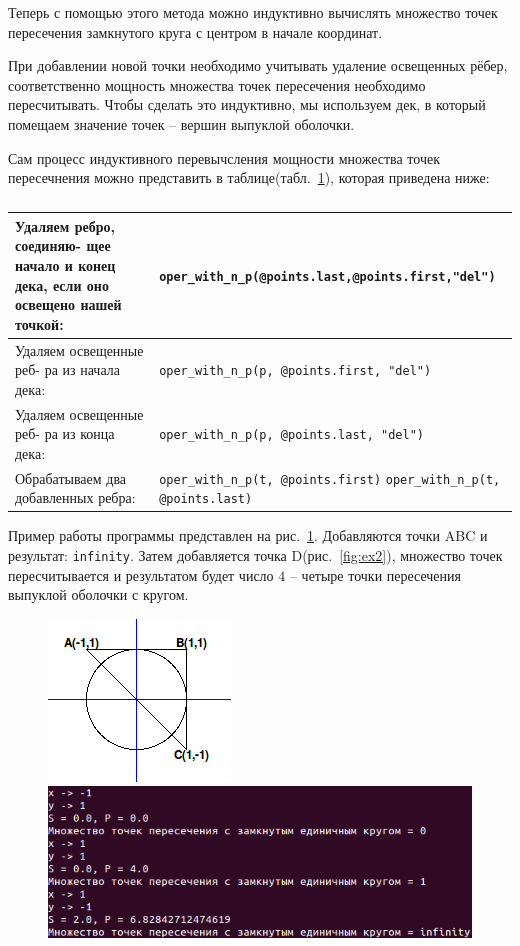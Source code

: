 Теперь с помощью этого метода можно индуктивно вычислять множество 
точек пересечения замкнутого круга с центром в начале координат.

При добавлении новой точки необходимо учитывать удаление освещенных 
рёбер, соответственно мощность множества точек пересечения необходимо 
пересчитывать. Чтобы сделать это индуктивно, мы используем дек, в 
который помещаем значение точек -- вершин выпуклой оболочки.

Сам процесс индуктивного перевычсления мощности множества точек 
пересечнения можно представить в таблице(табл.~\ref{tab:tab1}), которая приведена ниже:
\begin{table}[h!]
\begin{tabular}{|p{6cm}|p{10cm}|}
\hline
Удаляем ребро, соединяю-
щее начало и конец дека,
если оно освещено нашей
точкой:
&
\verb|oper_with_n_p(@points.last,@points.first,"del")|\\
\hline
Удаляем освещенные реб-
ра из начала дека:
&
\verb|oper_with_n_p(p, @points.first, "del")|\\
\hline
Удаляем освещенные реб-
ра из конца дека:
&
\verb|oper_with_n_p(p, @points.last, "del")|\\
\hline
Обрабатываем два добавленных ребра:
&
\verb|oper_with_n_p(t, @points.first)|
\verb|oper_with_n_p(t, @points.last)|\\
\hline
\end{tabular}
\caption{}\label{tab:tab1}
\end{table}

Пример работы программы представлен на рис.~\ref{fig:ex1}. 
Добавляются точки ABC и результат: \verb|infinity|. Затем добавляется 
точка D(рис.~\ref{fig:ex2}), множество точек пересчитывается и 
результатом будет число $4$ -- четыре точки пересечения выпуклой 
оболочки с кругом.
\begin{figure}[ht!]
\begin{center}
\includegraphics[scale=0.6]{images/circ}
\includegraphics[scale=0.5]{images/ex1}
\end{center}
\vspace*{-8mm}
\caption{}\label{fig:ex1}
\end{figure}


